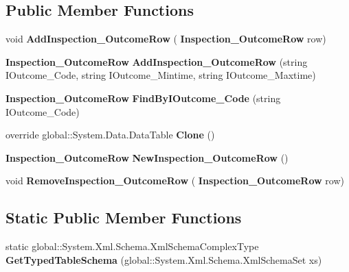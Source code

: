 \subsection*{Public Member Functions}
\begin{DoxyCompactItemize}
\item 
\mbox{\label{class_a_f_h___scheduler_1_1_home_inspection_data_set_1_1_inspection___outcome_data_table_a57fa75b954e0c375f0f0c64deccf5ba4}} 
void {\bfseries Add\+Inspection\+\_\+\+Outcome\+Row} (\textbf{ Inspection\+\_\+\+Outcome\+Row} row)
\item 
\mbox{\label{class_a_f_h___scheduler_1_1_home_inspection_data_set_1_1_inspection___outcome_data_table_aee00aaa406172d93734658fcbb8c8dfa}} 
\textbf{ Inspection\+\_\+\+Outcome\+Row} {\bfseries Add\+Inspection\+\_\+\+Outcome\+Row} (string I\+Outcome\+\_\+\+Code, string I\+Outcome\+\_\+\+Mintime, string I\+Outcome\+\_\+\+Maxtime)
\item 
\mbox{\label{class_a_f_h___scheduler_1_1_home_inspection_data_set_1_1_inspection___outcome_data_table_a013e12a426a749e08f70a021857ddb48}} 
\textbf{ Inspection\+\_\+\+Outcome\+Row} {\bfseries Find\+By\+I\+Outcome\+\_\+\+Code} (string I\+Outcome\+\_\+\+Code)
\item 
\mbox{\label{class_a_f_h___scheduler_1_1_home_inspection_data_set_1_1_inspection___outcome_data_table_a9bfbc938a1db0585a44447525b78503d}} 
override global\+::\+System.\+Data.\+Data\+Table {\bfseries Clone} ()
\item 
\mbox{\label{class_a_f_h___scheduler_1_1_home_inspection_data_set_1_1_inspection___outcome_data_table_aff9aa356d2d26f5771012efc43771d22}} 
\textbf{ Inspection\+\_\+\+Outcome\+Row} {\bfseries New\+Inspection\+\_\+\+Outcome\+Row} ()
\item 
\mbox{\label{class_a_f_h___scheduler_1_1_home_inspection_data_set_1_1_inspection___outcome_data_table_abd8a2986fba05c682982c72ecace2a58}} 
void {\bfseries Remove\+Inspection\+\_\+\+Outcome\+Row} (\textbf{ Inspection\+\_\+\+Outcome\+Row} row)
\end{DoxyCompactItemize}
\subsection*{Static Public Member Functions}
\begin{DoxyCompactItemize}
\item 
\mbox{\label{class_a_f_h___scheduler_1_1_home_inspection_data_set_1_1_inspection___outcome_data_table_ab5b1666557a72db6b08ecb5e5c74770e}} 
static global\+::\+System.\+Xml.\+Schema.\+Xml\+Schema\+Complex\+Type {\bfseries Get\+Typed\+Table\+Schema} (global\+::\+System.\+Xml.\+Schema.\+Xml\+Schema\+Set xs)
\end{DoxyCompactItemize}
